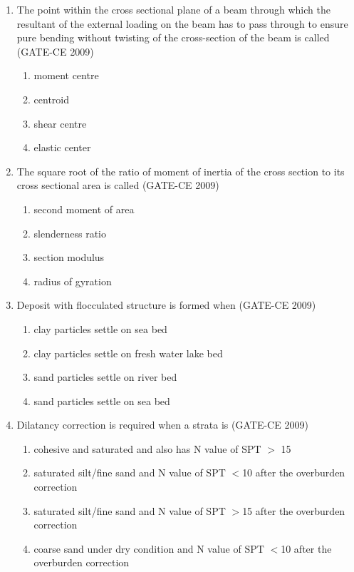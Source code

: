 \documentclass[journal,12pt,onecolumn]{article}
\theoremstyle{remark}
\begin{document}
\begin{enumerate}
    \item The point within the cross sectional plane of a beam through which the resultant of the external loading on the beam has to pass through to ensure pure bending without twisting of the cross-section of the beam is called (GATE-CE 2009)
    \begin{multicols}{2}
    \begin{enumerate}
        \item moment centre 
        \item centroid 
        \item shear centre 
        \item elastic center
    \end{enumerate}
    \end{multicols}
    
    \item The square root of the ratio of moment of inertia of the cross section to its cross sectional area is called (GATE-CE 2009)
    \begin{multicols}{2}
    \begin{enumerate}
        \item second moment of area 
        \item slenderness ratio 
        \item section modulus 
        \item radius of gyration
    \end{enumerate}
    \end{multicols}
    
    \item Deposit with flocculated structure is formed when (GATE-CE 2009)
    \begin{enumerate}
        \item clay particles settle on sea bed 
        \item clay particles settle on fresh water lake bed 
        \item sand particles settle on river bed 
        \item sand particles settle on sea bed
    \end{enumerate}
    
    \item Dilatancy correction is required when a strata is (GATE-CE 2009)
    \begin{enumerate}
        \item cohesive and saturated and also has N value of SPT $>$ 15
        \item saturated silt/fine sand and N value of SPT $<$10 after the overburden correction
        \item saturated silt/fine sand and N value of SPT $>$15 after the overburden correction
        \item coarse sand under dry condition and N value of SPT $<$10 after the overburden correction
    \end{enumerate}
    

\end{enumerate}
\end{document}
